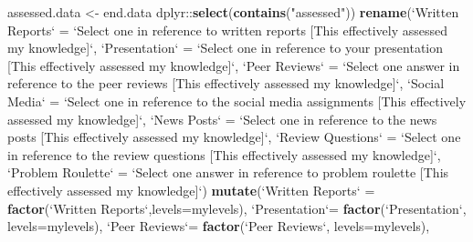 \documentclass[]{article}
\newenvironment{Shaded}{\begin{snugshade}}{\end{snugshade}}
\newcommand{\KeywordTok}[1]{\textcolor[rgb]{0.13,0.29,0.53}{\textbf{{#1}}}}
\newcommand{\DataTypeTok}[1]{\textcolor[rgb]{0.13,0.29,0.53}{{#1}}}
\newcommand{\StringTok}[1]{\textcolor[rgb]{0.31,0.60,0.02}{{#1}}}
\newcommand{\NormalTok}[1]{{#1}}
\begin{document}
\begin{Shaded}
\begin{Highlighting}[]
\NormalTok{assessed.data <-}\StringTok{ }
\StringTok{  }\NormalTok{end.data %
\StringTok{  }\NormalTok{dplyr::}\KeywordTok{select}\NormalTok{(}\KeywordTok{contains}\NormalTok{(}\StringTok{"assessed"}\NormalTok{)) %
\StringTok{  }\KeywordTok{rename}\NormalTok{(}\StringTok{`}\DataTypeTok{Written Reports}\StringTok{`} \NormalTok{=}\StringTok{ `}\DataTypeTok{Select one in reference to written reports [This effectively assessed my knowledge]}\StringTok{`}\NormalTok{,}
         \StringTok{`}\DataTypeTok{Presentation}\StringTok{`} \NormalTok{=}\StringTok{ `}\DataTypeTok{Select one in reference to your presentation [This effectively assessed my knowledge]}\StringTok{`}\NormalTok{,}
         \StringTok{`}\DataTypeTok{Peer Reviews}\StringTok{`} \NormalTok{=}\StringTok{ `}\DataTypeTok{Select one answer in reference to the peer reviews [This effectively assessed my knowledge]}\StringTok{`}\NormalTok{,}
         \StringTok{`}\DataTypeTok{Social Media}\StringTok{`} \NormalTok{=}\StringTok{ `}\DataTypeTok{Select one in reference to the social media assignments [This effectively assessed my knowledge]}\StringTok{`}\NormalTok{,}
         \StringTok{`}\DataTypeTok{News Posts}\StringTok{`} \NormalTok{=}\StringTok{ `}\DataTypeTok{Select one in reference to the news posts [This effectively assessed my knowledge]}\StringTok{`}\NormalTok{,}
         \StringTok{`}\DataTypeTok{Review Questions}\StringTok{`} \NormalTok{=}\StringTok{ `}\DataTypeTok{Select one in reference to the review questions [This effectively assessed my knowledge]}\StringTok{`}\NormalTok{,}
         \StringTok{`}\DataTypeTok{Problem Roulette}\StringTok{`} \NormalTok{=}\StringTok{ `}\DataTypeTok{Select one answer in reference to problem roulette [This effectively assessed my knowledge]}\StringTok{`}\NormalTok{) %
\StringTok{  }\KeywordTok{mutate}\NormalTok{(}\StringTok{`}\DataTypeTok{Written Reports}\StringTok{`} \NormalTok{=}\StringTok{ }\KeywordTok{factor}\NormalTok{(}\StringTok{`}\DataTypeTok{Written Reports}\StringTok{`}\NormalTok{,}\DataTypeTok{levels=}\NormalTok{mylevels),}
         \StringTok{`}\DataTypeTok{Presentation}\StringTok{`}\NormalTok{=}\StringTok{ }\KeywordTok{factor}\NormalTok{(}\StringTok{`}\DataTypeTok{Presentation}\StringTok{`}\NormalTok{, }\DataTypeTok{levels=}\NormalTok{mylevels),}
         \StringTok{`}\DataTypeTok{Peer Reviews}\StringTok{`}\NormalTok{=}\StringTok{ }\KeywordTok{factor}\NormalTok{(}\StringTok{`}\DataTypeTok{Peer Reviews}\StringTok{`}\NormalTok{, }\DataTypeTok{levels=}\NormalTok{mylevels),}
}}}
\end{Highlighting}
\end{Shaded}
\end{document}
